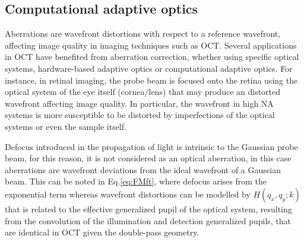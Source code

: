 \subsection{Computational adaptive optics}

Aberrations are wavefront distortions with respect to a reference wavefront, affecting image quality in imaging techniques such as OCT. Several applications in OCT have benefited from aberration correction, whether using specific optical systems, hardware-based adaptive optics or computational adaptive optics. For instance, in retinal imaging, the probe beam is focused onto the retina using the optical system of the eye itself (cornea/lens) that may produce an distorted wavefront affecting image quality. In particular, the wavefront in high NA systems is more susceptible to be distorted by imperfections of the optical systems or even the sample itself.

Defocus introduced in the propagation of light is intrinsic to the Gaussian probe beam, for this reason, it is not considered as an optical aberration, in this case aberrations are wavefront deviations from the ideal wavefront of a Gaussian beam. This can be noted in Eq.\eqref{eq:FMft}, where defocus arises from the exponential term whereas wavefront distortions can be modelled by $H(q_x, q_y; k)$ that is related to the effective generalized pupil of the optical system, resulting from the convolution of the illumination and detection generalized pupils, that are identical in OCT given the double-pass geometry.

